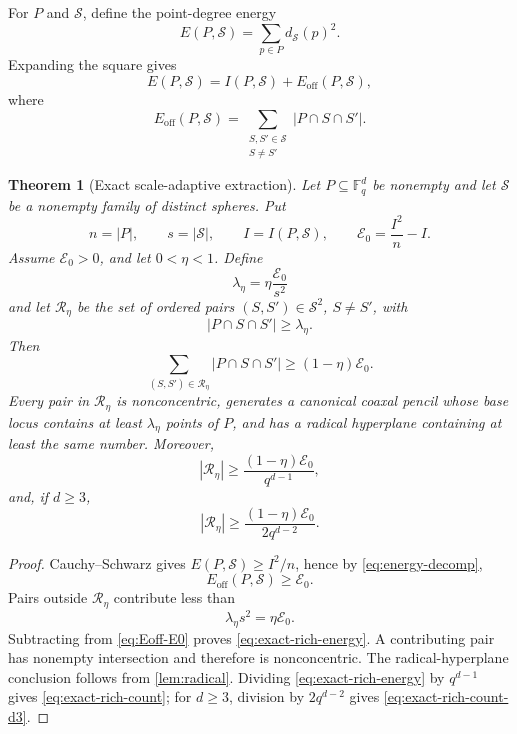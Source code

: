 \documentclass[11pt,letterpaper]{amsart}
\newtheorem{theorem}{Theorem}[section]
\theoremstyle{definition}
\theoremstyle{remark}
\newcommand{\1}{\mathbf 1}
\begin{document}
For $P$ and $\mathcal S$, define the point-degree energy
\[
 E(P,\mathcal S)=\sum_{p\in P}d_{\mathcal S}(p)^2.
\]
Expanding the square gives
\begin{equation}\label{eq:energy-decomp}
 E(P,\mathcal S)=I(P,\mathcal S)+E_{\mathrm{off}}(P,\mathcal S),
\end{equation}
where
\[
 E_{\mathrm{off}}(P,\mathcal S)=
 \sum_{\substack{S,S'\in\mathcal S\\S\ne S'}}
 |P\cap S\cap S'|.
\]

\begin{theorem}[Exact scale-adaptive extraction]\label{thm:exact-adaptive}
Let $P\subseteq\mathbb F_q^d$ be nonempty and let $\mathcal S$ be a nonempty family of distinct spheres.  Put
\[
 n=|P|,\qquad s=|\mathcal S|,\qquad I=I(P,\mathcal S),
 \qquad \mathcal E_0=\frac{I^2}{n}-I.
\]
Assume $\mathcal E_0>0$, and let $0<\eta<1$.  Define
\[
 \lambda_\eta=\eta\frac{\mathcal E_0}{s^2}
\]
and let $\mathcal R_\eta$ be the set of ordered pairs $(S,S')\in\mathcal S^2$, $S\ne S'$, with
\[
 |P\cap S\cap S'|\ge\lambda_\eta.
\]
Then
\begin{equation}\label{eq:exact-rich-energy}
 \sum_{(S,S')\in\mathcal R_\eta}|P\cap S\cap S'|
 \ge(1-\eta)\mathcal E_0.
\end{equation}
Every pair in $\mathcal R_\eta$ is nonconcentric, generates a canonical coaxal pencil whose base locus contains at least $\lambda_\eta$ points of $P$, and has a radical hyperplane containing at least the same number.  Moreover,
\begin{equation}\label{eq:exact-rich-count}
 |\mathcal R_\eta|\ge
 \frac{(1-\eta)\mathcal E_0}{q^{d-1}},
\end{equation}
and, if $d\ge3$,
\begin{equation}\label{eq:exact-rich-count-d3}
 |\mathcal R_\eta|\ge
 \frac{(1-\eta)\mathcal E_0}{2q^{d-2}}.
\end{equation}
\end{theorem}

\begin{proof}
Cauchy--Schwarz gives $E(P,\mathcal S)\ge I^2/n$, hence by \eqref{eq:energy-decomp},
\begin{equation}\label{eq:Eoff-E0}
 E_{\mathrm{off}}(P,\mathcal S)\ge\mathcal E_0.
\end{equation}
Pairs outside $\mathcal R_\eta$ contribute less than
\[
 \lambda_\eta s^2=\eta\mathcal E_0.
\]
Subtracting from \eqref{eq:Eoff-E0} proves \eqref{eq:exact-rich-energy}.  A contributing pair has nonempty intersection and therefore is nonconcentric.  The radical-hyperplane conclusion follows from \cref{lem:radical}.  Dividing \eqref{eq:exact-rich-energy} by $q^{d-1}$ gives \eqref{eq:exact-rich-count}; for $d\ge3$, division by $2q^{d-2}$ gives \eqref{eq:exact-rich-count-d3}.
\end{proof}
\end{document}
